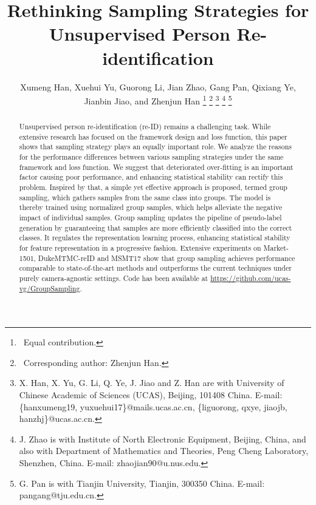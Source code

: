 \documentclass[lettersize,journal]{IEEEtran}
\begin{document}
\title{Rethinking Sampling Strategies for Unsupervised Person Re-identification}

\author{Xumeng Han, Xuehui Yu, Guorong Li, Jian Zhao, Gang Pan, Qixiang Ye,\\ Jianbin Jiao, and Zhenjun Han \thanks{\ Equal contribution.}
\thanks{\ Corresponding author: Zhenjun Han.} 
\thanks{X. Han, X. Yu, G. Li, Q. Ye, J. Jiao and Z. Han are with University of Chinese Academic of Sciences (UCAS), Beijing, 101408 China. E-mail: \{hanxumeng19, yuxuehui17\}@mails.ucas.ac.cn, \{liguorong, qxye, jiaojb, hanzhj\}@ucas.ac.cn.}
\thanks{J. Zhao is with Institute of North Electronic Equipment, Beijing, China, and also with Department of Mathematics and Theories, Peng Cheng Laboratory, Shenzhen, China. 
E-mail: zhaojian90@u.nus.edu.}
\thanks{G. Pan is with Tianjin University, Tianjin, 300350 China. E-mail: pangang@tju.edu.cn.}}











\maketitle
 
\begin{abstract}
Unsupervised person re-identification (re-ID) remains a challenging task.
While extensive research has focused on the framework design and loss function, this paper shows that sampling strategy plays an equally important role. 
We analyze the reasons for the performance differences between various sampling strategies under the same framework and loss function.
We suggest that deteriorated over-fitting is an important factor causing poor performance, and enhancing statistical stability can rectify this problem.
Inspired by that, a simple yet effective approach is proposed, termed group sampling, which gathers samples from the same class into groups. The model is thereby trained using normalized group samples, which helps alleviate the negative impact of individual samples. 
Group sampling updates the pipeline of pseudo-label generation by guaranteeing that samples are more efficiently classified into the correct classes. 
It regulates the representation learning process, enhancing statistical stability for feature representation in a progressive fashion.
Extensive experiments on Market-1501, DukeMTMC-reID and MSMT17 show that group sampling achieves performance comparable to state-of-the-art methods and outperforms the current techniques under purely camera-agnostic settings.
Code has been available at  \url{https://github.com/ucas-vg/GroupSampling}.
\end{abstract}
\end{document}
